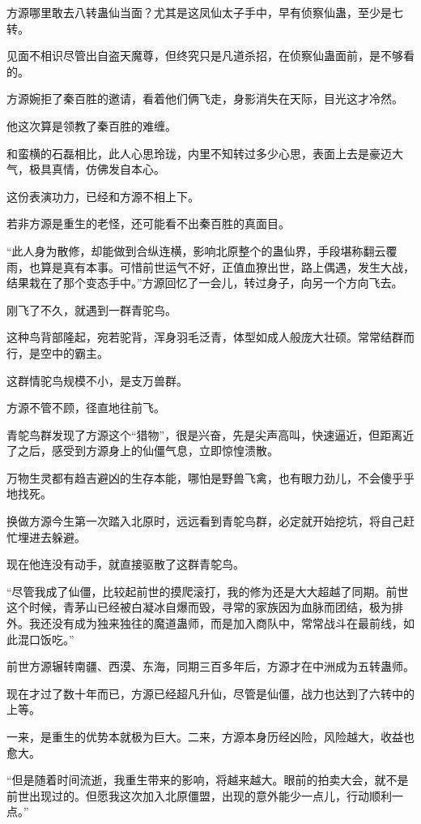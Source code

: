 \begin{this_body}
方源哪里敢去八转蛊仙当面？尤其是这凤仙太子手中，早有侦察仙蛊，至少是七转。

见面不相识尽管出自盗天魔尊，但终究只是凡道杀招，在侦察仙蛊面前，是不够看的。

方源婉拒了秦百胜的邀请，看着他们俩飞走，身影消失在天际，目光这才冷然。

他这次算是领教了秦百胜的难缠。

和蛮横的石磊相比，此人心思玲珑，内里不知转过多少心思，表面上去是豪迈大气，极具真情，仿佛发自本心。

这份表演功力，已经和方源不相上下。

若非方源是重生的老怪，还可能看不出秦百胜的真面目。

“此人身为散修，却能做到合纵连横，影响北原整个的蛊仙界，手段堪称翻云覆雨，也算是真有本事。可惜前世运气不好，正值血獠出世，路上偶遇，发生大战，结果栽在了那个变态手中。”方源回忆了一会儿，转过身子，向另一个方向飞去。

刚飞了不久，就遇到一群青驼鸟。

这种鸟背部隆起，宛若驼背，浑身羽毛泛青，体型如成人般庞大壮硕。常常结群而行，是空中的霸主。

这群情驼鸟规模不小，是支万兽群。

方源不管不顾，径直地往前飞。

青鸵鸟群发现了方源这个“猎物”，很是兴奋，先是尖声高叫，快速逼近，但距离近了之后，感受到方源身上的仙僵气息，立即惊惶溃散。

万物生灵都有趋吉避凶的生存本能，哪怕是野兽飞禽，也有眼力劲儿，不会傻乎乎地找死。

换做方源今生第一次踏入北原时，远远看到青鸵鸟群，必定就开始挖坑，将自己赶忙埋进去躲避。

现在他连没有动手，就直接驱散了这群青鸵鸟。

“尽管我成了仙僵，比较起前世的摸爬滚打，我的修为还是大大超越了同期。前世这个时候，青茅山已经被白凝冰自爆而毁，寻常的家族因为血脉而团结，极为排外。我还没有成为独来独往的魔道蛊师，而是加入商队中，常常战斗在最前线，如此混口饭吃。”

前世方源辗转南疆、西漠、东海，同期三百多年后，方源才在中洲成为五转蛊师。

现在才过了数十年而已，方源已经超凡升仙，尽管是仙僵，战力也达到了六转中的上等。

一来，是重生的优势本就极为巨大。二来，方源本身历经凶险，风险越大，收益也愈大。

“但是随着时间流逝，我重生带来的影响，将越来越大。眼前的拍卖大会，就不是前世出现过的。但愿我这次加入北原僵盟，出现的意外能少一点儿，行动顺利一点。”


\end{this_body}
